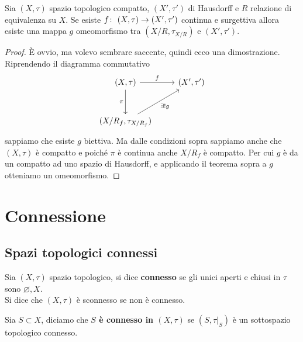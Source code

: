 \begin{corollary}
	\label{thr:freeomeombyquo}
	Sia $(X, \tau)$ spazio topologico compatto, $(X', \tau')$ di Hausdorff e $R$ relazione di equivalenza su $X$. Se esiste $f \colon\ (X, \tau) \rightarrow (X', \tau')$ continua e surgettiva allora esiste una mappa $g$ omeomorfismo tra $(X/R,\tau_{X/R})$ e $(X', \tau')$.
\end{corollary}
\begin{proof}
	È ovvio, ma volevo sembrare saccente, quindi ecco una dimostrazione.
	Riprendendo il diagramma commutativo 
	\begin{equation*}
		\begin{tikzcd}[row sep = 3em]
			(X, \tau) \arrow[swap]{d}{\pi} \arrow{r}{f} & (X', \tau') \\
			(X/R_f, \tau_{X/R_f}) \arrow[swap]{ru}{\exists! g} &
		\end{tikzcd}	
	\end{equation*}
	sappiamo che esiste $g$ biettiva. Ma dalle condizioni sopra sappiamo anche che $(X,\tau)$ è compatto e poiché $\pi$ è continua anche $X/R_f$ è compatto. Per cui $g$ è da un compatto ad uno spazio di Hausdorff, e applicando il teorema sopra a $g$ otteniamo un omeomorfismo. 
\end{proof}



\section{Connessione}
\subsection{\textcolor{TopGener}{\textbf{Spazi topologici connessi}}}



\begin{definition}
	Sia $(X, \tau)$ spazio topologico, si dice \textbf{connesso} se gli unici aperti e chiusi in $\tau$ sono $\varnothing, X$. \\ Si dice che $(X, \tau)$ è sconnesso se non è connesso. 
\end{definition} 

\begin{definition}
	Sia $S \subset X$, diciamo che \textbf{$S$ è connesso in $(X, \tau)$} se $(S, \tau|_S)$ è un sottospazio topologico connesso. 
\end{definition} 

